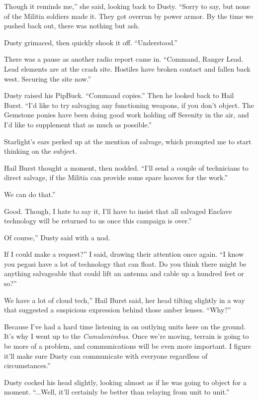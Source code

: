 \leavevmode{}Though it reminds me,” she said, looking back to Dusty. “Sorry to say, but none of the Militia soldiers made it. They got overrun by power armor. By the time we pushed back out, there was nothing but ash.

Dusty grimaced, then quickly shook it off. “Understood.”

There was a pause as another radio report came in. “Command, Ranger Lead. Lead elements are at the crash site. Hostiles have broken contact and fallen back west. Securing the site now.”

Dusty raised his PipBuck. “Command copies.” Then he looked back to Hail Burst. “I’d like to try salvaging any functioning weapons, if you don’t object. The Gemstone ponies have been doing good work holding off Serenity in the air, and I’d like to supplement that as much as possible.”

Starlight’s ears perked up at the mention of salvage, which prompted me to start thinking on the subject.

Hail Burst thought a moment, then nodded. “I’ll send a couple of technicians to direct salvage, if the Militia can provide some spare hooves for the work.”

\leavevmode{}We can do that.”

\leavevmode{}Good. Though, I hate to say it, I’ll have to insist that all salvaged Enclave technology will be returned to us once this campaign is over.”

\leavevmode{}Of course,” Dusty said with a nod.

\leavevmode{}If I could make a request?” I said, drawing their attention once again. “I know you pegasi have a lot of technology that can float. Do you think there might be anything salvageable that could lift an antenna and cable up a hundred feet or so?”

\leavevmode{}We have a lot of cloud tech,” Hail Burst said, her head tilting slightly in a way that suggested a suspicious expression behind those amber lenses. “Why?”

\leavevmode{}Because I’ve had a hard time listening in on outlying units here on the ground. It’s why I went up to the \textit{Cumulonimbus}. Once we’re moving, terrain is going to be more of a problem, and communications will be even more important. I figure it’ll make sure Dusty can communicate with everyone regardless of circumstances.”

Dusty cocked his head slightly, looking almost as if he was going to object for a moment. “...Well, it’ll certainly be better than relaying from unit to unit.”

